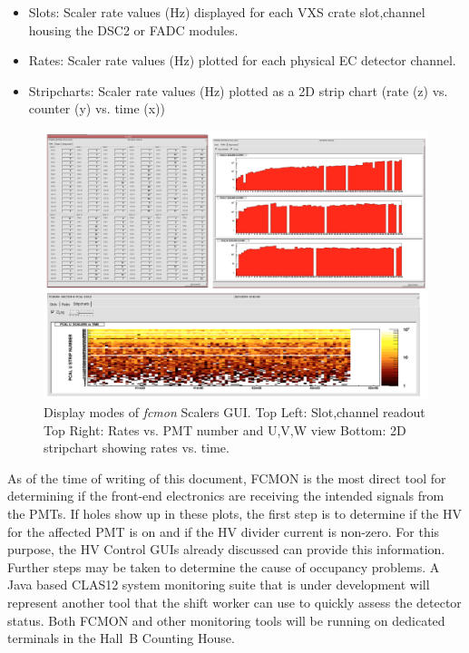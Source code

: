 \documentclass[letterpaper,10pt]{article}
\begin{document}
\begin{itemize}
\item Slots: Scaler rate values (Hz) displayed for each VXS crate slot,channel housing the DSC2 or FADC modules.
\item Rates: Scaler rate values (Hz) plotted for each physical EC detector channel.
\item Stripcharts: Scaler rate values (Hz) plotted as a 2D strip chart (rate (z) vs. counter (y)  vs. time (x))
\end{itemize}

\begin{figure}[htbp]
  \centering
  \includegraphics[width= 7in, keepaspectratio = true]{fcmon-screens}
  \vspace{2mm}
  \caption{Display modes of {\it fcmon} Scalers GUI. Top Left: Slot,channel readout Top Right: Rates vs. PMT
    number and U,V,W view Bottom: 2D stripchart showing rates vs. time.}
\label{fcmon2}
\end{figure}

As of the time of writing of this document, FCMON is the most direct tool for determining if the front-end
electronics are receiving the intended signals from the PMTs. If holes show up in these plots, the first step is
to determine if the HV for the affected PMT is on and if the HV divider current is non-zero.  For this purpose, the
HV Control GUIs already discussed can provide this information.  Further steps may be taken to determine the cause
of occupancy problems.  A Java based CLAS12 system monitoring suite that is under development will
represent another tool that the shift worker can use to quickly assess the detector status. Both FCMON and 
other monitoring tools will be running on dedicated terminals in the Hall~B Counting House.
\end{document}
